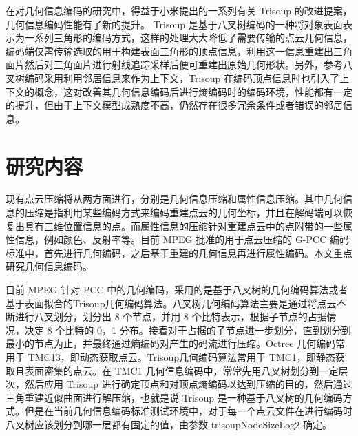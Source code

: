 \documentclass[bachelor,print,msfonts]{xduthesis}
\begin{document}
在对几何信息编码的研究中，得益于小米提出的一系列有关 Trisoup 的改进提案\cite{ref6,ref7,ref8,ref9,ref10,ref11}，几何信息编码性能有了新的提升。 Trisoup 是基于八叉树编码的一种将对象表面表示为一系列三角形的编码方式，这样的处理大大降低了需要传输的点云几何信息，编码端仅需传输选取的用于构建表面三角形的顶点信息，利用这一信息重建出三角面片然后对三角面片进行射线追踪采样后便可重建出原始几何形状。另外，参考八叉树编码采用利用邻居信息来作为上下文，Trisoup 在编码顶点信息时也引入了上下文的概念\cite{ref13}，这对改善其几何信息编码后进行熵编码时的编码环境，性能都有一定的提升，但由于上下文模型成熟度不高，仍然存在很多冗余条件或者错误的邻居信息。


\section{研究内容}
现有点云压缩将从两方面进行，分别是几何信息压缩和属性信息压缩。其中几何信息的压缩是指利用某些编码方式来编码重建点云的几何坐标，并且在解码端可以恢复出具有三维位置信息的点。而属性信息的压缩针对重建点云中的点附带的一些属性信息，例如颜色、反射率等。目前 MPEG 批准的用于点云压缩的 G-PCC 编码标准\cite{ref17}中，首先进行几何编码，之后基于重建的几何信息再进行属性编码。本文重点研究几何信息编码。

目前 MPEG 针对 PCC 中的几何编码，采用的是基于八叉树的几何编码算法\cite{ref18}或者基于表面拟合的Trisoup几何编码算法\cite{ref19}。八叉树几何编码算法主要是通过将点云不断进行八叉划分，划分出 8 个节点，并用 8 个比特表示，根据子节点的占据情况，决定 8 个比特的 0，1 分布。接着对于占据的子节点进一步划分，直到划分到最小的节点为止，并最终通过熵编码对产生的码流进行压缩。Octree 几何编码常用于 TMC13，即动态获取点云。Trisoup几何编码算法常用于 TMC1，即静态获取且表面密集的点云。在 TMC1 几何信息编码中，常常先用八叉树划分到一定层次，然后应用 Trisoup 进行确定顶点和对顶点熵编码以达到压缩的目的，然后通过三角重建近似曲面进行解压缩，也就是说 Trisoup 是一种基于八叉树的几何编码方式。但是在当前几何信息编码标准测试环境中，对于每一个点云文件在进行编码时八叉树应该划分到哪一层都有固定的值，由参数 trisoupNodeSizeLog2 确定。
\end{document}
